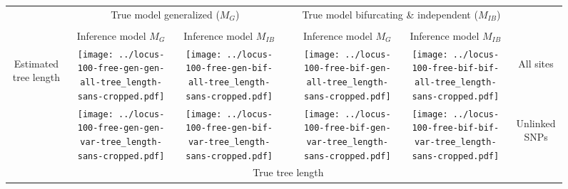 \documentclass[border=10pt,varwidth=30cm]{standalone}
\newcommand{\genmodel}{\ensuremath{M_{G}}\xspace}
\newcommand{\bimodel}{\ensuremath{M_{IB}}\xspace}
\begin{document}
\begin{figure}
    \setlength\arrayrulewidth{2pt}
    \centering
    \begin{tabular}{@{}ccccccc@{}}
        & \multicolumn{2}{c}{\LARGE True model generalized (\genmodel)}
        &
        & \multicolumn{2}{c}{\LARGE True model bifurcating \& independent (\bimodel)}
        & \\[1ex]
        \cline{2-3}\cline{5-6}
        & & & & & & \\
        & \multirow{1}{0.19\textwidth}{\centering\Large Inference model \genmodel}
        & \multirow{1}{0.19\textwidth}{\centering\Large Inference model \bimodel}
        &
        & \multirow{1}{0.19\textwidth}{\centering\Large Inference model \genmodel}
        & \multirow{1}{0.19\textwidth}{\centering\Large Inference model \bimodel}
        & \\[4ex]
        \multirow{2}{*}[5em]{\begin{sideways}\Large Estimated tree length\end{sideways}}
        & \texttt{[image: ../locus-100-free-gen-gen-all-tree\_length-sans-cropped.pdf]}
        & \texttt{[image: ../locus-100-free-gen-bif-all-tree\_length-sans-cropped.pdf]}
        &
        & \texttt{[image: ../locus-100-free-bif-gen-all-tree\_length-sans-cropped.pdf]}
        & \texttt{[image: ../locus-100-free-bif-bif-all-tree\_length-sans-cropped.pdf]}
        & \multirow{1}{*}[9em]{\begin{sideways}\Large All sites\end{sideways}} \\
        & \texttt{[image: ../locus-100-free-gen-gen-var-tree\_length-sans-cropped.pdf]}
        & \texttt{[image: ../locus-100-free-gen-bif-var-tree\_length-sans-cropped.pdf]}
        &
        & \texttt{[image: ../locus-100-free-bif-gen-var-tree\_length-sans-cropped.pdf]}
        & \texttt{[image: ../locus-100-free-bif-bif-var-tree\_length-sans-cropped.pdf]}
        & \multirow{1}{*}[10em]{\begin{sideways}\Large Unlinked SNPs\end{sideways}} \\
        & \multicolumn{5}{c}{\Large True tree length} & \\
    \end{tabular}
\end{figure}
\end{document}

